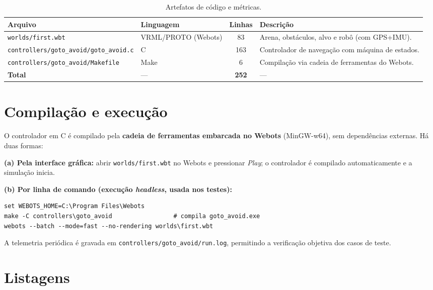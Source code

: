 \begin{table}[H]\centering
\caption{Artefatos de código e métricas.}
\renewcommand{\arraystretch}{1.2}
\begin{tabularx}{\textwidth}{@{}l l c X@{}}
\toprule
\textbf{Arquivo} & \textbf{Linguagem} & \textbf{Linhas} & \textbf{Descrição} \\
\midrule
\texttt{worlds/first.wbt} & VRML/PROTO (Webots) & 83 & Arena, obstáculos, alvo e robô (com GPS+IMU). \\
\texttt{controllers/goto\_avoid/goto\_avoid.c} & C & 163 & Controlador de navegação com máquina de estados. \\
\texttt{controllers/goto\_avoid/Makefile} & Make & 6 & Compilação via cadeia de ferramentas do Webots. \\
\midrule
\textbf{Total} & --- & \textbf{252} & --- \\
\bottomrule
\end{tabularx}
\end{table}

\section{Compilação e execução}
O controlador em C é compilado pela \textbf{cadeia de ferramentas embarcada no Webots} (MinGW-w64), sem dependências externas. Há duas formas:

\noindent\textbf{(a) Pela interface gráfica:} abrir \texttt{worlds/first.wbt} no Webots e pressionar \emph{Play}; o controlador é compilado automaticamente e a simulação inicia.

\noindent\textbf{(b) Por linha de comando (execução \emph{headless}, usada nos testes):}
\begin{lstlisting}[style=plain,numbers=none]
set WEBOTS_HOME=C:\Program Files\Webots
make -C controllers\goto_avoid                 # compila goto_avoid.exe
webots --batch --mode=fast --no-rendering worlds\first.wbt
\end{lstlisting}
A telemetria periódica é gravada em \texttt{controllers/goto\_avoid/run.log}, permitindo a verificação objetiva dos casos de teste.

\section{Listagens}
